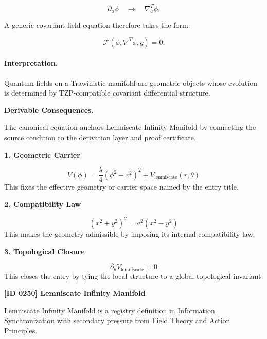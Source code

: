\begin{equation}
\partial_a\phi
\quad\longrightarrow\quad
\nabla^T_a\phi .
\end{equation}

A generic covariant field equation therefore takes the form:

\begin{equation}
\mathcal{F}
\left(
\phi,\nabla^T\phi,g
\right)
=
0 .
\end{equation}

\paragraph{Interpretation.}
Quantum fields on a Trawinistic manifold are geometric objects whose evolution is determined by TZP-compatible covariant differential structure.

\par\vspace{0.35em}
\noindent\textbf{Derivable Consequences.}\quad
\begingroup
\footnotesize
\raggedright
The canonical equation anchors Lemniscate Infinity Manifold by connecting the source condition to the derivation layer and proof certificate.
\par\endgroup

\noindent\textbf{1. Geometric Carrier}\par
\[
V(\phi)=\frac{\lambda}{4}(\phi^2-v^2)^2+V_{\mathrm{lemniscate}}(r,\theta)
\]
\noindent This fixes the effective geometry or carrier space named by the entry title.\par
\noindent\textbf{2. Compatibility Law}\par
\[
(x^2+y^2)^2=a^2(x^2-y^2)
\]
\noindent This makes the geometry admissible by imposing its internal compatibility law.\par
\noindent\textbf{3. Topological Closure}\par
\[
\partial_\theta V_{\mathrm{lemniscate}}=0
\]
\noindent This closes the entry by tying the local structure to a global topological invariant.\par

\clearpage
\noindent\textbf{[ID 0250] Lemniscate Infinity Manifold}\par
\vspace{0.35em}
\begingroup\small
{}
Lemniscate Infinity Manifold is a registry definition in Information Synchronization with secondary pressure from Field Theory and Action Principles.

